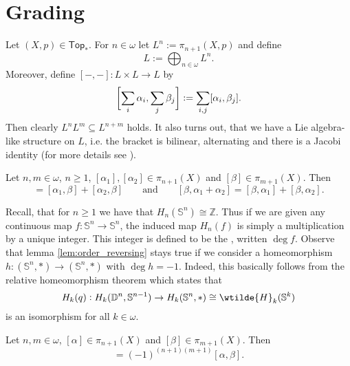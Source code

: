 \section{Grading}
Let $(X,p) \in \mathsf{Top}_\ast$. For $n \in \omega$ let $L^n := \pi_{n + 1}(X,p)$ and define
\begin{equation*}
	L := \bigoplus_{n \in \omega} L^n.
\end{equation*}
Moreover, define $[-,-] : L \times L \to L$ by
\begin{equation*}
	\sbr[3]{\sum_i \alpha_i, \sum_j \beta_j} := \sum_{i,j} [\alpha_i,\beta_j].
\end{equation*}
Then clearly $L^nL^m \subseteq L^{n + m}$ holds. It also turns out, that we have a Lie algebra-like structure on $L$, i.e. the bracket is bilinear, alternating and there is a Jacobi identity (for more details see \cite[474--478]{whitehead:homotopy_theory:1978}). 

\begin{proposition}
	Let $n,m \in \omega$, $n \geq 1$, $[\alpha_1], [\alpha_2] \in \pi_{n + 1}(X)$ and $[\beta] \in \pi_{m + 1}(X)$. Then
	\begin{equation*}
		[\alpha_1 + \alpha_2, \beta] = [\alpha_1,\beta] + [\alpha_2,\beta] \qquad \text{and} \qquad [\beta,\alpha_1 + \alpha_2] = [\beta,\alpha_1] + [\beta,\alpha_2].
	\end{equation*}
\end{proposition}

Recall, that for $n \geq 1$ we have that $H_n(\mathbb{S}^n) \cong \mathbb{Z}$. Thus if we are given any continuous map $f : \mathbb{S}^n \to \mathbb{S}^n$, the induced map $H_n(f)$ is simply a multiplication by a unique integer. This integer is defined to be the , written $\deg f$. Observe that lemma \ref{lem:order_reversing} stays true if we consider a homeomorphism $h : (\mathbb{S}^n,\ast) \to (\mathbb{S}^n,\ast)$ with $\deg h = -1$. Indeed, this basically follows from the relative homeomorphism theorem which states that
\begin{equation*}
	H_k(q) : H_k(\mathbb{D}^n,\mathbb{S}^{n - 1}) \to H_k(\mathbb{S}^n,\ast) \cong \wtilde{H}_k(\mathbb{S}^k)
\end{equation*}
\noindent is an isomorphism for all $k \in \omega$.

\begin{proposition}
	\label{prop:graded_commutative}
	Let $n,m \in \omega$, $[\alpha] \in \pi_{n + 1}(X)$ and $[\beta] \in \pi_{m + 1}(X)$. Then
	\begin{equation*}
		[\beta,\alpha] = (-1)^{(n + 1)(m + 1)}[\alpha,\beta].
	\end{equation*}
\end{proposition}

